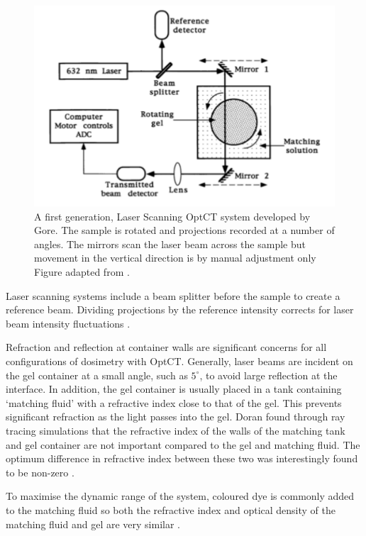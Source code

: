 \documentclass[12pt]{article}
\begin{document}
\begin{figure}[H]
\centering
\includegraphics[scale=0.6]{Gore_setup.pdf}
\caption{A first generation,  Laser Scanning OptCT system developed by Gore. The sample is rotated and projections recorded at a number of angles. The  mirrors scan the laser beam across the sample but movement in the vertical direction is by manual adjustment only Figure adapted from \cite{Gore:1999tg}. }
\label{fig:gore_setup}
\end{figure}


Laser scanning systems include a  beam splitter before the sample to create a reference beam. Dividing projections by the reference intensity  corrects for laser beam intensity fluctuations \cite{Gore:1999tg}.

Refraction and reflection at container walls are significant concerns for all configurations of dosimetry with OptCT. Generally, laser beams are incident on the gel container at a small angle, such as $5^{\circ}$, to avoid large reflection at the interface. In addition, the gel container is usually placed in a tank containing `matching fluid' with a refractive index close to that of the gel. This prevents significant refraction as the light passes into the gel. Doran found through ray tracing simulations that the refractive index of the walls of the matching tank and  gel container are not important compared to the gel and matching fluid. The optimum difference in refractive index between these two was interestingly found to be non-zero \cite{Doran:2001ee}. 

To maximise the dynamic range of the system, coloured dye is commonly added to the matching fluid so both the refractive index and optical density of the matching fluid and gel are very similar \cite{Krstajic:2006kna}. 
\end{document}
